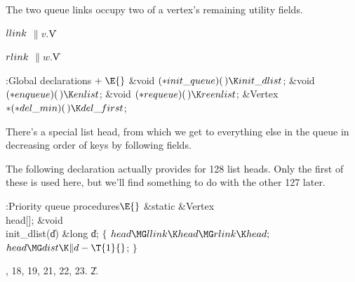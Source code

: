 The two queue links occupy two of a vertex's remaining utility fields.

\Y\B\4\D$\\{llink}$ \5
$\|v.{}$\|V%
\par
\B\4\D$\\{rlink}$ \5
$\|w.{}$\|V%
\par
\Y\B\4:Global declarations\X${}\mathrel+\E{}$\6
\&{void} ${}({*}\\{init\_queue})(\,)\K\\{init\_dlist}{}$;\6
\&{void} ${}({*}\\{enqueue})(\,)\K\\{enlist}{}$;\6
\&{void} ${}({*}\\{requeue})(\,)\K\\{reenlist}{}$;\6
\&{Vertex} ${}{*}({*}\\{del\_min})(\,)\K\\{del\_first}{}$;\par
\fi

There's a special list head, from which we get to everything else in the
queue in decreasing order of keys by following  fields.

The following declaration actually provides for 128 list heads. Only the first
of these is used here, but we'll find something to do with the
other 127 later.

\Y\B\4:Priority queue procedures\X${}\E{}$\6
\&{static} \&{Vertex} \\{head}[];\7
\1\1\&{void} \\{init\_dlist}(\|d)\6
\&{long} \|d;\2\2\6
${}\{{}$\1\6
${}\\{head}\MG\\{llink}\K\\{head}\MG\\{rlink}\K\\{head};{}$\6
${}\\{head}\MG\\{dist}\K\|d-\T{1}{}$;\6
\4${}\}{}$\2\par
{}, 18, 19, 21, 22, 23.
\U2.\fi

